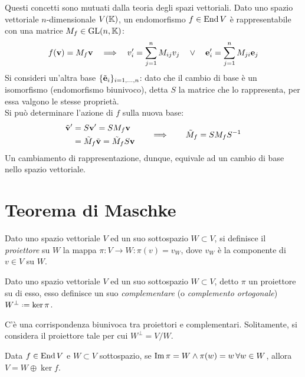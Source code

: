 Questi concetti sono mutuati dalla teoria degli spazi vettoriali. Dato uno spazio vettoriale $ n $-dimensionale $ V(\mathbb{K}) $, un endomorfismo $ f \in \operatorname{End}{V} $ è rappresentabile con una matrice $ M_f \in \mathrm{GL}(n,\mathbb{K}) $:
\begin{equation*}
	f(\mathbf{v}) = M_f \mathbf{v} \quad \Longrightarrow \quad v'_i = \sum_{j = 1}^{n} M_{ij} v_j \quad \lor \quad \mathbf{e}'_i = \sum_{j = 1}^{n} M_{ji} \mathbf{e}_j
\end{equation*}
Si consideri un'altra base $ \{\tilde{\mathbf{e}}_i\}_{i = 1, \dots, n} $: dato che il cambio di base è un isomorfismo (endomorfismo biunivoco), detta $ S $ la matrice che lo rappresenta, per essa valgono le stesse proprietà.\\
Si può determinare l'azione di $ f $ sulla nuova base:
\begin{equation*}
	\begin{split}
		\tilde{\mathbf{v}}'
		&= S \mathbf{v}' = S M_f \mathbf{v}\\
		&= \tilde{M}_f \tilde{\mathbf{v}} = \tilde{M}_f S \mathbf{v}
	\end{split}
	\qquad \Longrightarrow \qquad
	\tilde{M}_f = S M_f S^{-1}
\end{equation*}
Un cambiamento di rappresentazione, dunque, equivale ad un cambio di base nello spazio vettoriale.

\section{Teorema di Maschke}

\begin{definition}
	Dato uno spazio vettoriale $ V $ ed un suo sottospazio $ W \subset V $, si definisce il \textit{proiettore} su $ W $ la mappa $ \pi : V \rightarrow W : \pi(v) = v_W $, dove $ v_W $ è la componente di $ v \in V $ su $ W $.
\end{definition}

\begin{definition}
	Dato uno spazio vettoriale $ V $ ed un suo sottospazio $ W \subset V $, detto $ \pi $ un proiettore su di esso, esso definisce un suo \textit{complementare} (o \textit{complemento ortogonale}) $ W^{\perp} \defeq \ker{\pi} $.
\end{definition}

C'è una corrispondenza biunivoca tra proiettori e complementari. Solitamente, si considera il proiettore tale per cui $ W^{\perp} = V / W $.

\begin{proposition}
	Data $ f \in \operatorname{End}{V}  $ e $ W \subset V $ sottospazio, se $ \operatorname{Im}{\pi} = W \land \pi(w) = w \,\forall w \in W $, allora $ V = W \oplus \ker{f} $.
\end{proposition}

